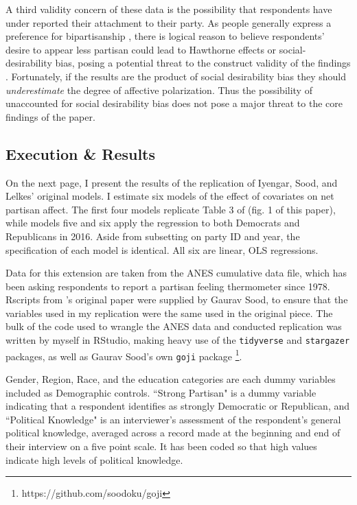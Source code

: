 \documentclass[12pt]{article}
\begin{document}
A third validity concern of these data is the possibility that respondents have under reported their attachment to their party. As people generally express a preference for bipartisanship \citep{harbridge2014public}, there is logical reason to believe respondents' desire to appear less partisan could lead to Hawthorne effects or social-desirability bias, posing a potential threat to the construct validity of the findings \citep[p. 73, Table 3.1 Item 8]{shadish2002experimental}. Fortunately, if the results are the product of social desirability bias they should \textit{underestimate} the degree of affective polarization. Thus the possibility of unaccounted for social desirability bias does not pose a major threat to the core findings of the paper.


\subsection{Execution \& Results}

On the next page, I present the results of the replication of Iyengar, Sood, and Lelkes' original models. I estimate six models of the effect of covariates on net partisan affect. The first four models replicate Table 3 of \cite{iyengar2012affect} (fig. 1 of this paper), while models five and six apply the regression to both Democrats and Republicans in 2016. Aside from subsetting on party ID and year, the specification of each model is identical. All six are linear, OLS regressions.

Data for this extension are taken from the ANES cumulative data file, which has been asking respondents to report a partisan feeling thermometer since 1978. Rscripts from \citeauthor{iyengar2012affect}'s original paper were supplied by Gaurav Sood, to ensure that the variables used in my replication were the same used in the original piece. The bulk of the code used to wrangle the ANES data and conducted replication was written by myself in RStudio, making heavy use of the \texttt{tidyverse} and \texttt{stargazer} packages, as well as Gaurav Sood's own \texttt{goji} package \footnote{https://github.com/soodoku/goji}.

Gender, Region, Race, and the education categories are each dummy variables included as Demographic controls. ``Strong Partisan" is a dummy variable indicating that a respondent identifies as strongly Democratic or Republican, and ``Political Knowledge" is an interviewer's assessment of the respondent's general political knowledge, averaged across a record made at the beginning and end of their interview on a five point scale. It has been coded so that high values indicate high levels of political knowledge.
\end{document}
